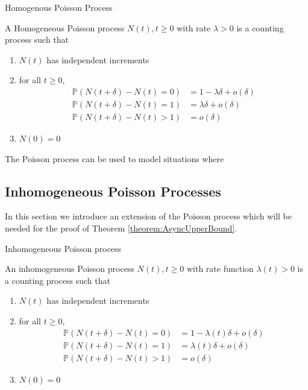 \begin{definition}
	Homogenous Poisson Process

	\noindent
	A Homogeneous Poisson process ${N(t), t \geq 0}$ with rate $\lambda > 0$ is a counting process such that
	\begin{enumerate}
		\item $N(t)$ has independent increments
		\item for all $t \geq 0$, 
		\begin{align*}
			\mathbb{P}(N(t + \delta) - N(t) = 0) &= 1 - \lambda\delta + o(\delta) \\
			\mathbb{P}(N(t + \delta) - N(t) = 1) &= \lambda\delta + o(\delta) \\
			\mathbb{P}(N(t + \delta) - N(t) > 1) &= o(\delta)
		\end{align*}
		\item $N(0) = 0$
	\end{enumerate}
\end{definition}

The Poisson process can be used to model situations where %


\subsection{Inhomogeneous Poisson Processes}

In this section we introduce an extension of the Poisson process which will be needed for the proof of Theorem \ref{theorem:AsyncUpperBound}.

\begin{definition}
	Inhomogeneous Poisson process

	\noindent
	An inhomogeneous Poisson process ${N(t), t \geq 0}$ with rate function $\lambda(t) > 0$ is a counting process such that
	\begin{enumerate}
		\item $N(t)$ has independent increments
		\item for all $t \geq 0$, 
		\begin{align*}
			\mathbb{P}(N(t + \delta) - N(t) = 0) &= 1 - \lambda(t)\delta + o(\delta) \\
			\mathbb{P}(N(t + \delta) - N(t) = 1) &= \lambda(t)\delta + o(\delta) \\
			\mathbb{P}(N(t + \delta) - N(t) > 1) &= o(\delta)
		\end{align*}
		\item $N(0) = 0$
	\end{enumerate}
\end{definition}

